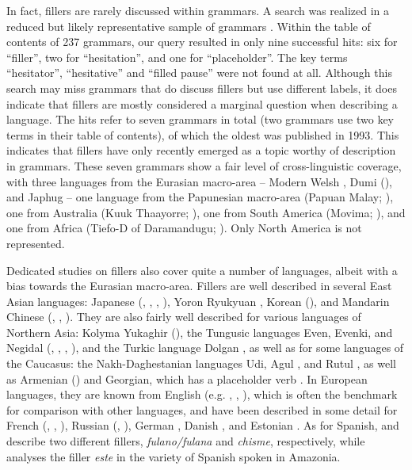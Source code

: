 \documentclass[output=paper]{langscibook}
\begin{document}
In fact, fillers are rarely discussed within grammars. A search was realized in a reduced but likely representative sample of grammars \citep{LahaussoisToAppear}. Within the table of contents of 237 grammars, our query resulted in only nine successful hits: six for “filler”, two for “hesitation”, and one for “placeholder”. The key terms  “hesitator”, “hesitative” and “filled pause” were not found at all. Although this search may miss grammars that do discuss fillers but use different labels, it does indicate that fillers are mostly considered a marginal question when describing a language. The hits refer to seven grammars in total (two grammars use two key terms in their table of contents), of which the oldest was published in 1993. This indicates that fillers have only recently emerged as a topic worthy of description in grammars. These seven grammars show a fair level of cross-linguistic coverage, with three languages from the Eurasian macro-area – Modern Welsh \citep{King2003}, Dumi (\citealt{Driem1993}), and Japhug \citep{Jacques2021} – one language from the Papunesian macro-area (Papuan Malay; \citealt{Kluge2017}), one from Australia (Kuuk Thaayorre; \citealt{Gaby2017}), one from South America (Movima; \citealt{Haude2006}), and one from Africa (Tiefo-D of Daramandugu; \citealt{Heath2021}). Only North America is not represented.

Dedicated studies on fillers also cover quite a number of languages, albeit with a bias towards the Eurasian macro-area. Fillers are well described in several East Asian languages: Japanese (\citealt{Kitano1999}, \citealt{Hayashi2006}, \citealt{Seraku2022a}, \citealt{Seraku2022b}), Yoron Ryukyuan \citep{Seraku2020}, Korean (\citealt{Hayashi2006}), and Mandarin Chinese (\citealt{Zhao2005}, \citealt{Hayashi2006}, \citealt{Cheung2015}). They are also fairly well described for various languages of Northern Asia: Kolyma Yukaghir (\citealt{chapters/ventayol_boada}), the Tungusic languages Even, Evenki, and Negidal (\citealt{Matić2008}, \citealt{Klyachko2022}, \citealt{chapters/klyachko}, \citealt{chapters/pakendorf}), and the Turkic language Dolgan \citep{Dabritz2018}, as well as for some languages of the Caucasus: the Nakh-Daghestanian languages Udi, Agul \citep{Ganenkov2010}, and Rutul \citep{Maisak2023}, as well as Armenian (\citealt{KhurshudyanPodlesskaya2006}) and Georgian, which has a placeholder verb \citep{AmiridzeGeorgian2010}. In European languages, they are known from English (e.g. \citealt{Enfield2003}, \citealt{Palacios_martinez2015}, \citealt{Tarnyikova2019}), which is often the benchmark for comparison with other languages, and have been described in some detail for French (\citealt{Mihatsch2006}, \citealt{Hennecke2022}, \citealt{Corminboeuf2023}), Russian (\citealt{Podlesskaya2009}, \citealt{Podlesskaya2022}), German \citep{Vogel2020}, Danish \citep{Navaretta2015}, and Estonian \citep{Keevallik2010}. As for Spanish, \citet{Bajo_perez2019} and \citet{Mihatsch2024} describe two different fillers, \textit{fulano/fulana} and \textit{chisme}, respectively, while \citet{Vallejos-yopan2023} analyses the filler \textit{este} in the variety of Spanish spoken in Amazonia. 
\end{document}
